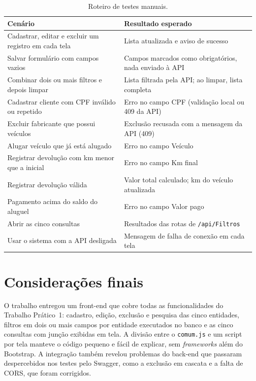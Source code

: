 \documentclass[12pt]{article}
\begin{document}
\begin{table}[htbp]
\centering
\caption{Roteiro de testes manuais.}
\label{tab:testes}
\small
\begin{tabularx}{\linewidth}{@{}>{\raggedright\arraybackslash}X>{\raggedright\arraybackslash}X@{}}
\toprule
\textbf{Cenário} & \textbf{Resultado esperado} \\
\midrule
Cadastrar, editar e excluir um registro em cada tela & Lista atualizada e aviso de sucesso \\
Salvar formulário com campos vazios & Campos marcados como obrigatórios, nada enviado à API \\
Combinar dois ou mais filtros e depois limpar & Lista filtrada pela API; ao limpar, lista completa \\
Cadastrar cliente com CPF inválido ou repetido & Erro no campo CPF (validação local ou 409 da API) \\
Excluir fabricante que possui veículos & Exclusão recusada com a mensagem da API (409) \\
Alugar veículo que já está alugado & Erro no campo Veículo \\
Registrar devolução com km menor que a inicial & Erro no campo Km final \\
Registrar devolução válida & Valor total calculado; km do veículo atualizada \\
Pagamento acima do saldo do aluguel & Erro no campo Valor pago \\
Abrir as cinco consultas & Resultados das rotas de \texttt{/api/Filtros} \\
Usar o sistema com a API desligada & Mensagem de falha de conexão em cada tela \\
\bottomrule
\end{tabularx}
\end{table}

\section{Considerações finais}
\label{sec:conclusao}

O trabalho entregou um front-end que cobre todas as funcionalidades do Trabalho Prático~1:
cadastro, edição, exclusão e pesquisa das cinco entidades, filtros em dois ou mais campos por
entidade executados no banco e as cinco consultas com junção exibidas em tela. A divisão entre o
\texttt{comum.js} e um script por tela manteve o código pequeno e fácil de explicar, sem
\emph{frameworks} além do Bootstrap. A integração também revelou problemas do back-end que passaram
despercebidos nos testes pelo Swagger, como a exclusão em cascata e a falta de CORS, que foram
corrigidos.
\end{document}
